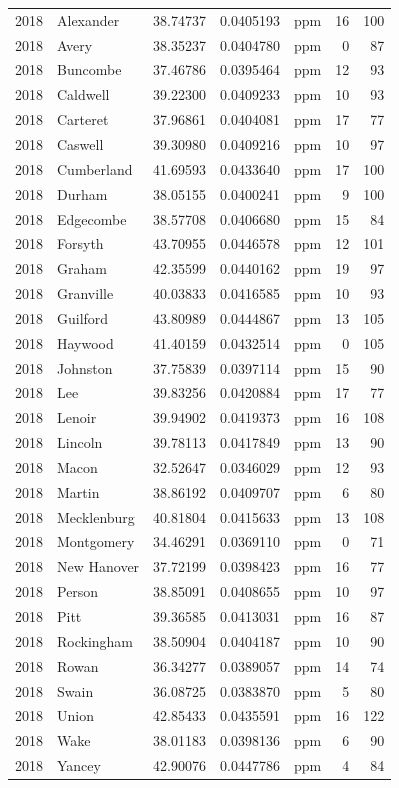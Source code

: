 \documentclass[12pt,]{article}
\begin{document}
\begin{longtable}[]{@{}rlrrlrr@{}}
2018 & Alexander & 38.74737 & 0.0405193 & ppm & 16 & 100\tabularnewline
2018 & Avery & 38.35237 & 0.0404780 & ppm & 0 & 87\tabularnewline
2018 & Buncombe & 37.46786 & 0.0395464 & ppm & 12 & 93\tabularnewline
2018 & Caldwell & 39.22300 & 0.0409233 & ppm & 10 & 93\tabularnewline
2018 & Carteret & 37.96861 & 0.0404081 & ppm & 17 & 77\tabularnewline
2018 & Caswell & 39.30980 & 0.0409216 & ppm & 10 & 97\tabularnewline
2018 & Cumberland & 41.69593 & 0.0433640 & ppm & 17 & 100\tabularnewline
2018 & Durham & 38.05155 & 0.0400241 & ppm & 9 & 100\tabularnewline
2018 & Edgecombe & 38.57708 & 0.0406680 & ppm & 15 & 84\tabularnewline
2018 & Forsyth & 43.70955 & 0.0446578 & ppm & 12 & 101\tabularnewline
2018 & Graham & 42.35599 & 0.0440162 & ppm & 19 & 97\tabularnewline
2018 & Granville & 40.03833 & 0.0416585 & ppm & 10 & 93\tabularnewline
2018 & Guilford & 43.80989 & 0.0444867 & ppm & 13 & 105\tabularnewline
2018 & Haywood & 41.40159 & 0.0432514 & ppm & 0 & 105\tabularnewline
2018 & Johnston & 37.75839 & 0.0397114 & ppm & 15 & 90\tabularnewline
2018 & Lee & 39.83256 & 0.0420884 & ppm & 17 & 77\tabularnewline
2018 & Lenoir & 39.94902 & 0.0419373 & ppm & 16 & 108\tabularnewline
2018 & Lincoln & 39.78113 & 0.0417849 & ppm & 13 & 90\tabularnewline
2018 & Macon & 32.52647 & 0.0346029 & ppm & 12 & 93\tabularnewline
2018 & Martin & 38.86192 & 0.0409707 & ppm & 6 & 80\tabularnewline
2018 & Mecklenburg & 40.81804 & 0.0415633 & ppm & 13 &
108\tabularnewline
2018 & Montgomery & 34.46291 & 0.0369110 & ppm & 0 & 71\tabularnewline
2018 & New Hanover & 37.72199 & 0.0398423 & ppm & 16 & 77\tabularnewline
2018 & Person & 38.85091 & 0.0408655 & ppm & 10 & 97\tabularnewline
2018 & Pitt & 39.36585 & 0.0413031 & ppm & 16 & 87\tabularnewline
2018 & Rockingham & 38.50904 & 0.0404187 & ppm & 10 & 90\tabularnewline
2018 & Rowan & 36.34277 & 0.0389057 & ppm & 14 & 74\tabularnewline
2018 & Swain & 36.08725 & 0.0383870 & ppm & 5 & 80\tabularnewline
2018 & Union & 42.85433 & 0.0435591 & ppm & 16 & 122\tabularnewline
2018 & Wake & 38.01183 & 0.0398136 & ppm & 6 & 90\tabularnewline
2018 & Yancey & 42.90076 & 0.0447786 & ppm & 4 & 84\tabularnewline
\bottomrule
\end{longtable}

\pagebreak
\end{document}
